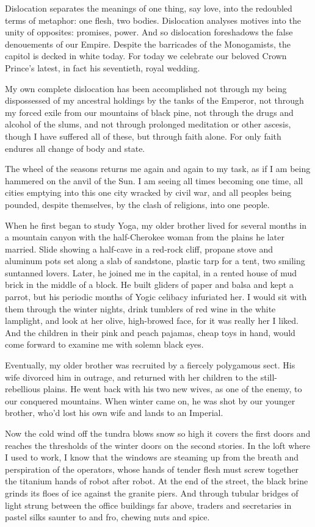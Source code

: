 \documentclass[english,11pt,letterpaper,onecolumn]{scrbook}
\begin{document}
	Dislocation separates the meanings of one thing, say love, into the redoubled terms of metaphor:  one flesh, two bodies.  Dislocation analyses motives into the unity of opposites:  promises, power.  And so dislocation foreshadows the false denouements of our Empire.  Despite the barricades of the Monogamists, the capitol is decked in white today.  For today we celebrate our beloved Crown Prince's latest, in fact his seventieth, royal wedding.

	My own complete dislocation has been accomplished not through my being dispossessed of my ancestral holdings by the tanks of the Emperor, not through my forced exile from our mountains of black pine, not through the drugs and alcohol of the slums, and not through prolonged meditation or other ascesis, though I have suffered all of these, but through faith alone.  For only faith endures all change of body and state.

	The wheel of the seasons returns me again and again to my task, as if I am being hammered on the anvil of the Sun.  I am seeing all times becoming one time, all cities emptying into this one city wracked by civil war, and all peoples being pounded, despite themselves, by the clash of religions, into one people.

	When he first began to study Yoga, my older brother lived for several months in a mountain canyon with the half-Cherokee woman from the plains he later married.  Slide showing a half-cave in a red-rock cliff, propane stove and aluminum pots set along a slab of sandstone, plastic tarp for a tent, two smiling suntanned lovers.  Later, he joined me in the capital, in a rented house of mud brick in the middle of a block.  He built gliders of paper and balsa and kept a parrot, but his periodic months of Yogic celibacy infuriated her.  I would sit with them through the winter nights, drink tumblers of red wine in the white lamplight, and look at her olive, high-browed face, for it was really her I liked.  And the children in their pink and peach pajamas, cheap toys in hand, would come forward to examine me with solemn black eyes.

	Eventually, my older brother was recruited by a fiercely polygamous sect.  His wife divorced him in outrage, and returned with her children to the still-rebellious plains.  He went back with his two new wives, as one of the enemy, to our conquered mountains.  When winter came on, he was shot by our younger brother, who'd lost his own wife and lands to an Imperial.

	Now the cold wind off the tundra blows snow so high it covers the first doors and reaches the thresholds of the winter doors on the second stories.  In the loft where I used to work, I know that the windows are steaming up from the breath and perspiration of the operators, whose hands of tender flesh must screw together the titanium hands of robot after robot.  At the end of the street, the black brine grinds its floes of ice against the granite piers.  And through tubular bridges of light strung between the office buildings far above, traders and secretaries in pastel silks saunter to and fro, chewing nuts and spice.
\end{document}

